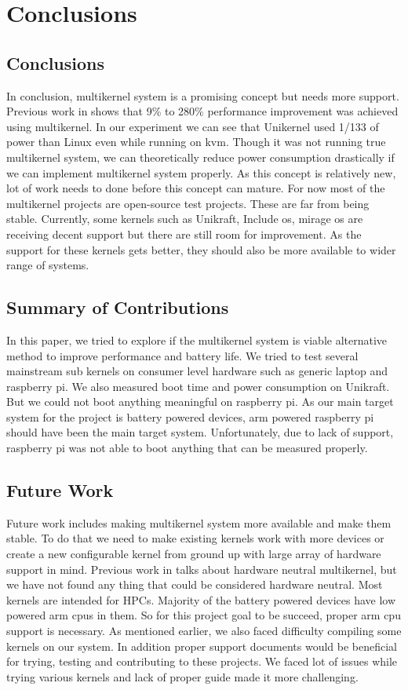 \documentclass[11pt]{article}       %
\begin{document}
\section{Conclusions} \label{concl}


\subsection{Conclusions} 
In conclusion, multikernel system is a promising concept but needs more support. Previous work in \cite{DEL01} shows that 9\% to 280\% performance improvement was achieved using multikernel. In our experiment we can see that Unikernel used 1/133 of power than Linux even while running on kvm. Though it was not running true multikernel system, we can theoretically reduce power consumption drastically if we can implement multikernel system properly. As this concept is relatively new, lot of work needs to done before this concept can mature. For now most of the multikernel projects are open-source test projects. These are far from being  stable. Currently, some kernels such as Unikraft, Include os, mirage os are receiving decent support but there are still room for improvement. As the support for these kernels gets better, they should also be more available to wider range of systems. 
\subsection{Summary of Contributions}
In this paper, we tried to explore if the multikernel system is viable alternative method to improve performance and battery life. We tried to test several mainstream sub kernels on consumer level hardware such as generic laptop and raspberry pi. We also measured boot time and power consumption on Unikraft. But we could not boot anything meaningful on raspberry pi. As our main target system for the project is battery powered devices, arm powered raspberry pi should have been the main target system. Unfortunately, due to lack of support, raspberry pi was not able to boot anything that can be measured properly.
\subsection{Future Work}
Future work includes making multikernel system more available and make them stable. To do that we need to make existing kernels work with more devices or create a new configurable kernel from ground up with large array of hardware support in mind. Previous work in \cite{DEL02} talks about hardware neutral multikernel, but we have not found any thing that could be considered hardware neutral. Most kernels are intended for HPCs. Majority of the battery powered devices have low powered arm cpus in them. So for this project goal to be succeed, proper arm cpu support is necessary. As mentioned earlier, we also faced difficulty compiling some kernels on our system. In addition proper support documents would be beneficial for trying, testing and contributing to these projects. We faced lot of issues while trying various kernels and lack of proper guide  made it more challenging. 
\end{document}
